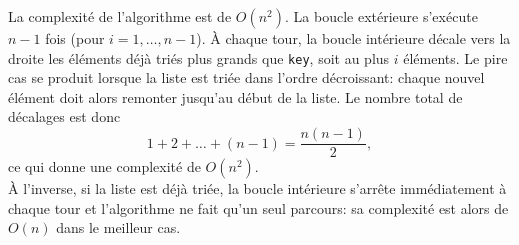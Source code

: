 \begin{Exercice} [20 minutes]
    \begin{solution}
        La complexité de l'algorithme est de $O(n^2)$. La boucle extérieure s'exécute $n-1$ fois (pour $i = 1, \dots, n-1$). À chaque tour, la boucle intérieure décale vers la droite les éléments déjà triés plus grands que \lstinline{key}, soit au plus $i$ éléments. Le pire cas se produit lorsque la liste est triée dans l'ordre décroissant: chaque nouvel élément doit alors remonter jusqu'au début de la liste. Le nombre total de décalages est donc
        \[ 1 + 2 + \dots + (n-1) = \frac{n(n-1)}{2}, \]
        ce qui donne une complexité de $O(n^2)$. \\

        À l'inverse, si la liste est déjà triée, la boucle intérieure s'arrête immédiatement à chaque tour et l'algorithme ne fait qu'un seul parcours: sa complexité est alors de $O(n)$ dans le meilleur cas.
    \end{solution}
    
\end{Exercice}


